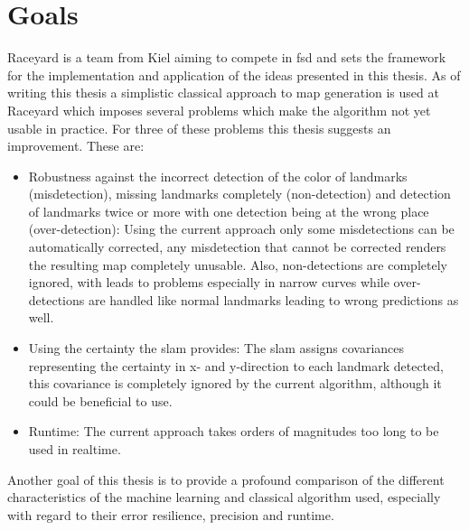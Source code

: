 


\section{Goals}
Raceyard is a team from Kiel aiming to compete in \ac{fsd} and sets the framework for the implementation and application of the ideas presented in this thesis. As of writing this thesis a simplistic classical approach to map generation is used at Raceyard which imposes several problems which make the algorithm not yet usable in practice. For three of these problems this thesis suggests an improvement. These are:

\begin{itemize}
    \item Robustness against the incorrect detection of the color of landmarks (misdetection), missing landmarks completely (non-detection) and detection of landmarks twice or more with one detection being at the wrong place (over-detection): Using the current approach only some misdetections can be automatically corrected, any misdetection that cannot be corrected renders the resulting map completely unusable. Also, non-detections are completely ignored, with leads to problems especially in narrow curves while over-detections are handled like normal landmarks leading to wrong predictions as well.
    \item Using the certainty the \ac{slam} provides: The \ac{slam} assigns covariances representing the certainty in x- and y-direction to each landmark detected, this covariance is completely ignored by the current algorithm, although it could be beneficial to use.
    \item Runtime: The current approach takes orders of magnitudes too long to be used in realtime.
\end{itemize}

Another goal of this thesis is to provide a profound comparison of the different characteristics of the machine learning and classical algorithm used, especially with regard to their error resilience, precision and runtime.

